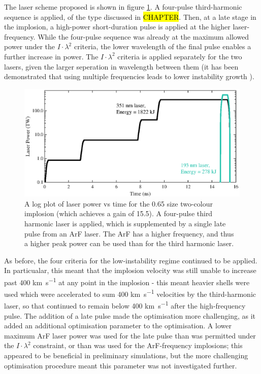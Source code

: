 The laser scheme proposed is shown in figure \ref{fig:Two colour sequence}. A four-pulse third-harmonic sequence is applied, of the type discussed in \hl{CHAPTER}. Then, at a late stage in the implosion, a high-power short-duration pulse is applied at the higher laser-frequency. While the four-pulse sequence was already at the maximum allowed power under the $I \cdot \lambda^2$ criteria, the lower wavelength of the final pulse enables a further increase in power. The $I \cdot \lambda^2$ criteria is applied separately for the two lasers, given the larger seperation in wavelength between them (it has been demonstrated that using multiple frequencies leads to lower instability growth \cite{Follett2018}).

\begin{figure}[ht]
\centering
\includegraphics{figures/FurtherSims/TwoColourLaser.eps}
\caption{A log plot of laser power vs time for the 0.65 size two-colour implosion (which achieves a gain of 15.5). A four-pulse third harmonic laser is applied, which is supplemented by a single late pulse from an ArF laser. The ArF has a higher frequency, and thus a higher peak power can be used than for the third harmonic laser.}
\label{fig:Two colour sequence}
\end{figure}

As before, the four criteria for the low-instability regime continued to be applied. In particualar, this meant that the implosion velocity was still unable to increase past 400 \unit{\kilo\meter\per\second} at any point in the implosion - this meant heavier shells were used which were accelerated to sum 400 \unit{\kilo\meter\per\second} velocities by the third-harmonic laser, so that continued to remain below 400 \unit{\kilo\meter\per\second} after the high-frequency pulse. The addition of a late pulse made the optimisation more challenging, as it added an additional optimisation parameter to the optimisation. A  lower maximum ArF laser power was used for the late pulse than was permitted under the $I \cdot \lambda^2$ constraint, or than was used for the ArF-frequency implosions; this appeared to be beneficial in preliminary simulations, but the more challenging optimisation procedure meant this parameter was not investigated further. 

